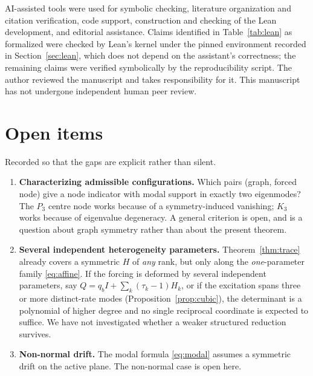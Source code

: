 \documentclass[11pt]{article}
\theoremstyle{plain}
\theoremstyle{definition}
\theoremstyle{remark}
\begin{document}
AI-assisted tools were used for symbolic checking, literature organization and citation
verification, code support, construction and checking of the Lean development, and editorial
assistance. Claims identified in Table~\ref{tab:lean} as formalized were checked by Lean's kernel
under the pinned environment recorded in Section~\ref{sec:lean}, which does not depend on the
assistant's correctness; the remaining claims were verified symbolically by the reproducibility
script. The author reviewed the manuscript and takes responsibility for it. This manuscript has not
undergone independent human peer review.

\appendix

\section{Open items}\label{sec:open}

Recorded so that the gaps are explicit rather than silent.

\begin{enumerate}\itemsep3pt
\item \textbf{Characterizing admissible configurations.} Which pairs (graph, forced node) give a
  node indicator with modal support in exactly two eigenmodes? The $P_3$ centre node works because
  of a symmetry-induced vanishing; $K_3$ works because of eigenvalue degeneracy. A general
  criterion is open, and is a question about graph symmetry rather than about the present theorem.
\item \textbf{Several independent heterogeneity parameters.} Theorem~\ref{thm:trace} already
  covers a symmetric $H$ of \emph{any} rank, but only along the \emph{one}-parameter family
  \eqref{eq:affine}. If the forcing is deformed by several independent parameters, say
  $Q=q_bI+\sum_k(\tau_k-1)H_k$, or if the excitation spans three or more distinct-rate modes
  (Proposition~\ref{prop:cubic}), the determinant is a polynomial of higher degree and no single
  reciprocal coordinate is expected to suffice. We have not investigated whether a weaker
  structured reduction survives.
\item \textbf{Non-normal drift.} The modal formula \eqref{eq:modal} assumes a symmetric drift on
  the active plane. The non-normal case is open here.
\end{enumerate}



\end{document}
